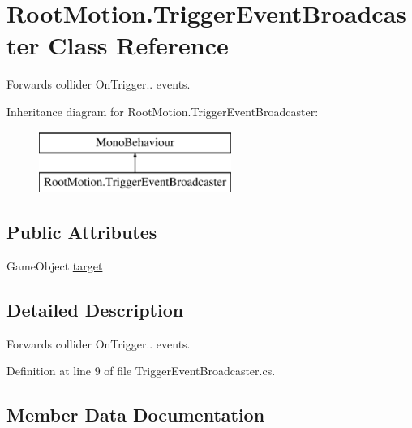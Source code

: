 \hypertarget{class_root_motion_1_1_trigger_event_broadcaster}{}\section{Root\+Motion.\+Trigger\+Event\+Broadcaster Class Reference}
\label{class_root_motion_1_1_trigger_event_broadcaster}


Forwards collider On\+Trigger.. events.  


Inheritance diagram for Root\+Motion.\+Trigger\+Event\+Broadcaster\+:\begin{figure}[H]
\begin{center}
\leavevmode
\includegraphics[height=2.000000cm]{class_root_motion_1_1_trigger_event_broadcaster}
\end{center}
\end{figure}
\subsection*{Public Attributes}
\begin{DoxyCompactItemize}
\item 
Game\+Object \mbox{\hyperlink{class_root_motion_1_1_trigger_event_broadcaster_a38d5f279fba5ec942958fd5681d5fe85}{target}}
\end{DoxyCompactItemize}


\subsection{Detailed Description}
Forwards collider On\+Trigger.. events. 



Definition at line 9 of file Trigger\+Event\+Broadcaster.\+cs.



\subsection{Member Data Documentation}
\mbox{\label{class_root_motion_1_1_trigger_event_broadcaster_a38d5f279fba5ec942958fd5681d5fe85}} 
